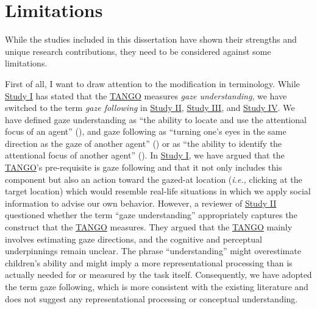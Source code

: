 \documentclass[
]{scrbook}
\begin{document}
\section{Limitations}\label{limitations}

While the studies included in this dissertation have shown their strengths and unique research contributions, they need to be considered against some limitations.

First of all, I want to draw attention to the modification in terminology. While \hyperref[studyI]{Study I} has stated that the \hyperref[acronyms_TANGO]{TANGO} measures \emph{gaze understanding}, we have switched to the term \emph{gaze following} in \hyperref[studyII]{Study II}, \hyperref[studyIII]{Study III}, and \hyperref[studyIV]{Study IV}. We have defined gaze understanding as ``the ability to locate and use the attentional focus of an agent'' (), and gaze following as ``turning one's eyes in the same direction as the gaze of another agent'' () or as ``the ability to identify the attentional focus of another agent'' (). In \hyperref[studyI]{Study I}, we have argued that the \hyperref[acronyms_TANGO]{TANGO}'s pre-requisite is gaze following and that it not only includes this component but also an action toward the gazed-at location (\emph{i.e.,} clicking at the target location) which would resemble real-life situations in which we apply social information to advise our own behavior. However, a reviewer of \hyperref[studyII]{Study II} questioned whether the term ``gaze understanding'' appropriately captures the construct that the \hyperref[acronyms_TANGO]{TANGO} measures. They argued that the \hyperref[acronyms_TANGO]{TANGO} mainly involves estimating gaze directions, and the cognitive and perceptual underpinnings remain unclear. The phrase ``understanding'' might overestimate children's ability and might imply a more representational processing than is actually needed for or measured by the task itself. Consequently, we have adopted the term gaze following, which is more consistent with the existing literature and does not suggest any representational processing or conceptual understanding.
\end{document}
